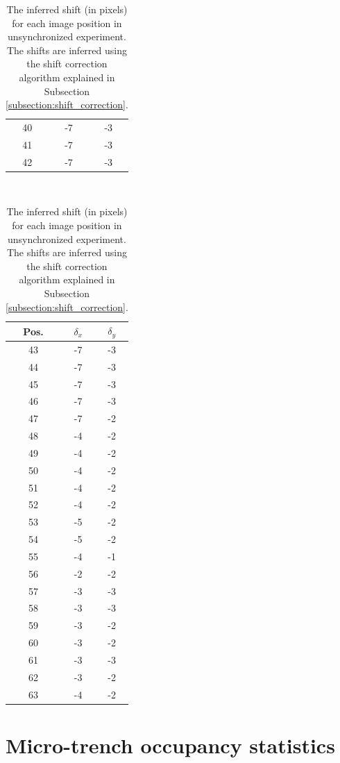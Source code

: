 \documentclass[pdftex,12pt,a4paper]{report}
\begin{document}
\begin{appendices}
\begin{table}[H]
\begin{tabular}[t]{ c | c | c }
\\
40 & -7 & -3
\\
41 & -7 & -3
\\
42 & -7 & -3
\\
\hline
\end{tabular}
~
\begin{tabular}[t]{ c | c | c }
\hline
Pos. & $\delta_x$ & $\delta_y$
\\
\hline\hline
43 & -7 & -3
\\
44 & -7 & -3
\\
45 & -7 & -3
\\
46 & -7 & -3
\\
47 & -7 & -2
\\
48 & -4 & -2
\\
49 & -4 & -2
\\
50 & -4 & -2
\\
51 & -4 & -2
\\
52 & -4 & -2
\\
53 & -5 & -2
\\
54 & -5 & -2
\\
55 & -4 & -1
\\
56 & -2 & -2
\\
57 & -3 & -3
\\
58 & -3 & -3
\\
59 & -3 & -2
\\
60 & -3 & -2
\\
61 & -3 & -3
\\
62 & -3 & -2
\\
63 & -4 & -2
\\
\hline
\end{tabular}
\caption[The inferred shift (in pixels) for each image position in unsynchronized experiment]{The inferred shift (in pixels) for each image position in unsynchronized experiment. The shifts are inferred using the shift correction algorithm explained in Subsection \ref{subsection:shift_correction}.}
\label{table:inferred_shift}
\end{table}

\section{Micro-trench occupancy statistics}


\end{appendices}
\end{document}
